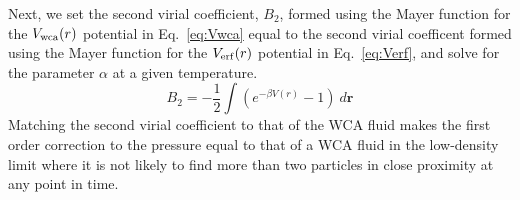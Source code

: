 \documentclass[letterpaper,twocolumn,amsmath,amssymb,prb]{revtex4-1}
\newcommand\davidsays[1]{{\bf \color{blue}D: #1}}
\begin{document}

Next, we set the second virial coefficient, $B_2$, formed using the Mayer 
function for the $V_{\mathrm{wca}}(r)$ potential 
in Eq.~\ref{eq:Vwca} equal to the second virial coefficent formed using 
the Mayer function for the $V_{\mathrm{erf}}(r)$ potential in Eq.~\ref{eq:Verf}, 
and solve for the parameter $\alpha$ at a given temperature.
\begin{equation}B_2=-\frac{1}{2}\int (e^{-\beta V(r)} - 1)~d\textbf{r}\end{equation}
Matching the second virial coefficient to that of the WCA fluid 
makes the first order correction to the pressure equal to that of a WCA fluid 
in the low-density limit where it is not likely to find more than two
particles in close proximity at any point in time. 
\end{document}
